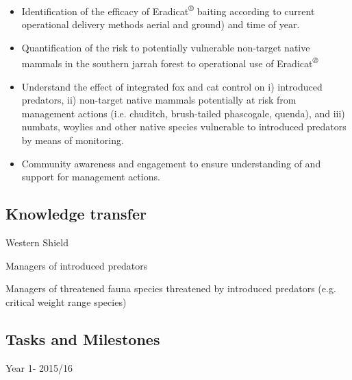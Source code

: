 \documentclass[version=last,
    paper=a4,                               %
    10pt,                                   %
    dvipsnames,
    oneside,                              %
    headings=openany,                       %
    open=any,
    BCOR=7mm,                               %
    DIV=15,     %
]{scrbook}
\begin{document}
\begin{itemize}
\itemsep1pt\parskip0pt
\item
  Identification of the efficacy of Eradicat\emph{\textsuperscript{®}}
  baiting according to current operational delivery methods aerial and
  ground) and time of year.
\item
  Quantification of the risk to potentially vulnerable non-target native
  mammals in the southern jarrah forest to operational use of
  Eradicat\emph{\textsuperscript{®}}
\item
  Understand the effect of integrated fox and cat control on i)
  introduced predators, ii) non-target native mammals potentially at
  risk from management actions (i.e. chuditch, brush-tailed phascogale,
  quenda), and iii) numbats, woylies and other native species vulnerable
  to introduced predators by means of monitoring.
\item
  Community awareness and engagement to ensure understanding of and
  support for management actions.
\end{itemize}




\subsection*{Knowledge transfer}

Western Shield

Managers of introduced predators

Managers of threatened fauna species threatened by introduced predators
(e.g. critical weight range species)




\subsection*{Tasks and Milestones}

Year 1- 2015/16
\end{document}
